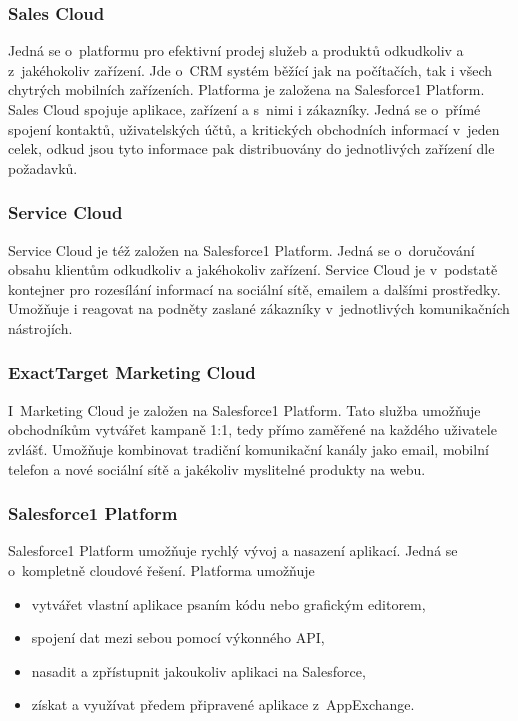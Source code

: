 \subsubsection{Sales Cloud}
Jedná se o~platformu pro efektivní prodej služeb a produktů odkudkoliv a z~jakéhokoliv zařízení. Jde o~CRM systém běžící jak na počítačích, tak i všech chytrých mobilních zařízeních. Platforma je založena na Salesforce1 Platform. Sales Cloud spojuje aplikace, zařízení a s~nimi i zákazníky. Jedná se o~přímé spojení kontaktů, uživatelských účtů, a kritických obchodních informací v~jeden celek, odkud jsou tyto informace pak distribuovány do jednotlivých zařízení dle požadavků.\cite{salesforce:salesCloud}

\subsubsection{Service Cloud}
Service Cloud je též založen na Salesforce1 Platform. Jedná se o~doručování obsahu klientům odkudkoliv a jakéhokoliv zařízení. Service Cloud je v~podstatě kontejner pro rozesílání informací na sociální sítě, emailem a dalšími prostředky. Umožňuje i reagovat na podněty zaslané zákazníky v~jednotlivých komunikačních nástrojích.\cite{salesforce:serviceCloud}

\subsubsection{ExactTarget Marketing Cloud}
I~Marketing Cloud je založen na Salesforce1 Platform. Tato služba umožňuje obchodníkům vytvářet kampaně 1:1, tedy přímo zaměřené na každého uživatele zvlášť. Umožňuje kombinovat tradiční komunikační kanály jako email, mobilní telefon a nové sociální sítě a jakékoliv myslitelné produkty na webu.\cite{salesforce:marketingCloud}

\subsubsection{Salesforce1 Platform}
Salesforce1 Platform umožňuje rychlý vývoj a nasazení aplikací. Jedná se o~kompletně cloudové řešení\cite{salesforce:platform}. Platforma umožňuje
	\begin{itemize}
		\item vytvářet vlastní aplikace psaním kódu nebo grafickým editorem,
		\item spojení dat mezi sebou pomocí výkonného API,
		\item nasadit a zpřístupnit jakoukoliv aplikaci na Salesforce,
		\item získat a využívat předem připravené aplikace z~AppExchange.
	\end{itemize}

